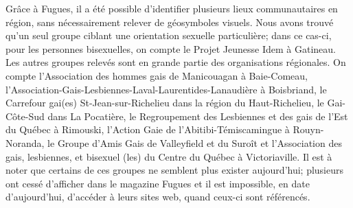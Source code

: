 Grâce à Fugues, il a été possible d'identifier plusieurs lieux communautaires en région, sans nécessairement relever de géosymboles visuels.
Nous avons trouvé qu'un seul groupe ciblant une orientation sexuelle particulière; dans ce cas-ci, pour les personnes bisexuelles, on compte le Projet Jeunesse Idem à Gatineau.
Les autres groupes relevés sont en grande partie des organisations régionales.
On compte l'Association des hommes gais de Manicouagan à Baie-Comeau, l'Association-Gais-Lesbiennes-Laval-Laurentides-Lanaudière à Boisbriand, le Carrefour gai(es) St-Jean-sur-Richelieu dans la région du Haut-Richelieu, le Gai-Côte-Sud dans La Pocatière, le Regroupement des Lesbiennes et des gais de l'Est du Québec à Rimouski, l'Action Gaie de l'Abitibi-Témiscamingue à Rouyn-Noranda, le Groupe d'Amis Gais de Valleyfield et du Suroît et l'Association des gais, lesbiennes, et bisexuel (les) du Centre du Québec à Victoriaville.
Il est à noter que certains de ces groupes ne semblent plus exister aujourd'hui; plusieurs ont cessé d'afficher dans le magazine Fugues et il est impossible, en date d'aujourd'hui, d'accéder à leurs sites web, quand ceux-ci sont référencés.


